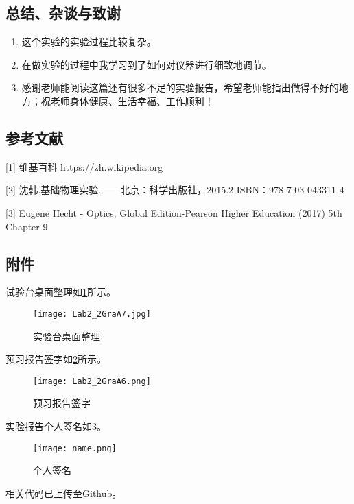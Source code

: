 \documentclass[dvipsnames, svgnames,a4paper,11pt]{article}
\begin{document}
	\subsection{总结、杂谈与致谢}
	\begin{enumerate}
		\item 这个实验的实验过程比较复杂。
		\item 在做实验的过程中我学习到了如何对仪器进行细致地调节。
		\item 感谢老师能阅读这篇还有很多不足的实验报告，希望老师能指出做得不好的地方；祝老师身体健康、生活幸福、工作顺利！
	\end{enumerate}
	
	\subsection{参考文献}
	[1] 维基百科 https://zh.wikipedia.org
	
	[2] 沈韩.基础物理实验.——北京：科学出版社，2015.2 ISBN：978-7-03-043311-4
	
	[3] Eugene Hecht - Optics, Global Edition-Pearson Higher Education (2017) 5th Chapter 9 
	
	
	\subsection{附件}
	试验台桌面整理如\cref{fig:figA7}所示。
	
	\begin{figure}[htbp]
		\centering
		\texttt{[image: Lab2\_2GraA7.jpg]}
		\caption{实验台桌面整理}
		\label{fig:figA7}
	\end{figure}
	
	预习报告签字如\cref{fig:figA6}所示。
	
	\begin{figure}[htbp]
		\centering
		\texttt{[image: Lab2\_2GraA6.png]}
		\caption{预习报告签字}
		\label{fig:figA6}
	\end{figure}
	
	实验报告个人签名如\cref{fig:name}。
	
	\begin{figure}[htbp]
		\centering
		\texttt{[image: name.png]}
		\caption{个人签名}
		\label{fig:name}
	\end{figure}
	
	
	相关代码已上传至Github。
	
	
	
\end{document}
